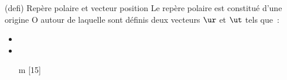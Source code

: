 \documentclass[../../main/main.tex]{subfiles}
\begin{document}
\begin{tcb*}[sidebyside, righthand ratio=.35](defi)
	{Repère polaire et vecteur position}
	Le repère polaire est constitué d'une origine O autour de laquelle sont
	définis deux vecteurs $\ur$ et $\ut$ tels que~:
	\begin{itemize}
		\item {}
		\item {}
		\item[m][15] \psw{%
			      \[
				      \boxed{\OM(t) = r(t)\ur}
				      \qet
				      \boxed{\norm{\OM}(t) = r(t)}
			      \]
		      }%
		      \vspace{-15pt}
	\end{itemize}
	\begin{center}
	\end{center}
	\tcblower
	\begin{center}
		\vspace{-15pt}
	\end{center}
\end{tcb*}
\end{document}
